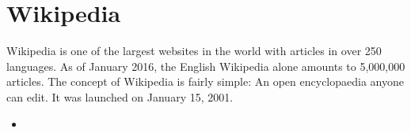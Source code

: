 \section{Wikipedia}
Wikipedia is one of the largest websites in the world with articles in over 250 languages. As of January 2016, the English Wikipedia alone amounts to 5,000,000 articles. 
The concept of Wikipedia is fairly simple: An open encyclopaedia anyone can edit. It was launched on January 15, 2001. 


\begin{itemize}
\item
\end{itemize}


